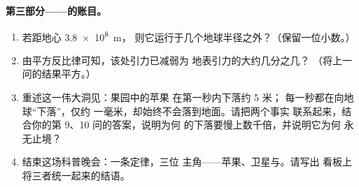 \begin{problem}
\medskip\noindent\textbf{第三部分——的账目。}
\begin{enumerate}[resume]
  \item 若距地心 \qty{3.8e8}{m}，
        则它运行于几个地球半径之外？（保留一位小数。）
  \item 由平方反比律可知，该处引力已减弱为
        地表引力的大约几分之几？
        （将上一问的结果平方。）
  \item 重述这一伟大洞见：果园中的苹果
        在第一秒内下落约 5 米；
        每一秒都在向地球“下落”，仅约
        一毫米，却始终不会落到地面。请把两个事实
        联系起来，结合你的第 9、10 问的答案，说明为何
        的下落要慢上数千倍，并说明它为何
        永无止境？
  \item 结束这场科普晚会：一条定律，三位
        主角——苹果、卫星与。请写出
        看板上将三者统一起来的结语。
\end{enumerate}
\end{problem}
